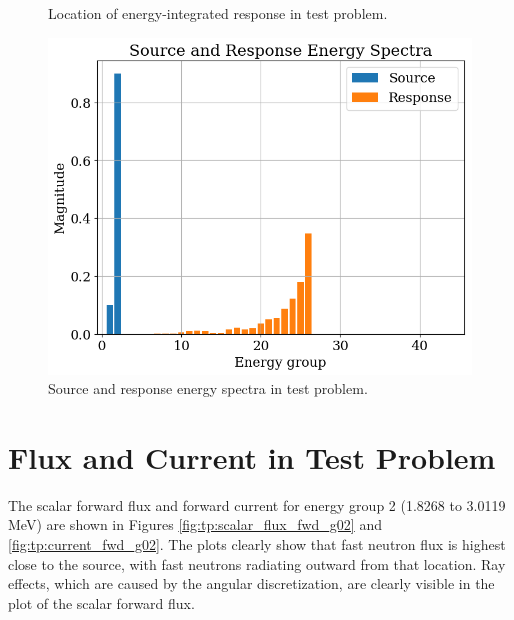 \begin{figure}
\begin{minipage}{0.495\linewidth}
    \caption{Location of energy-integrated response in test problem.}
    \label{fig:tp:response_total}
  \end{minipage}
  \centering
  \includegraphics[width=0.6\linewidth]{content/testprob/spectra_lin.png}
  \caption{Source and response energy spectra in test problem.}
  \label{fig:tp:spectra_lin}
\end{figure}

\section{Flux and Current in Test Problem}
\label{sec:bg:tp:flux}

The scalar forward flux and forward current for energy group 2 (1.8268 to 3.0119 MeV) are shown in Figures \ref{fig:tp:scalar_flux_fwd_g02} and \ref{fig:tp:current_fwd_g02}.
The plots clearly show that fast neutron flux is highest close to the source, with fast neutrons radiating outward from that location.
Ray effects, which are caused by the angular discretization, are clearly visible in the plot of the scalar forward flux.

